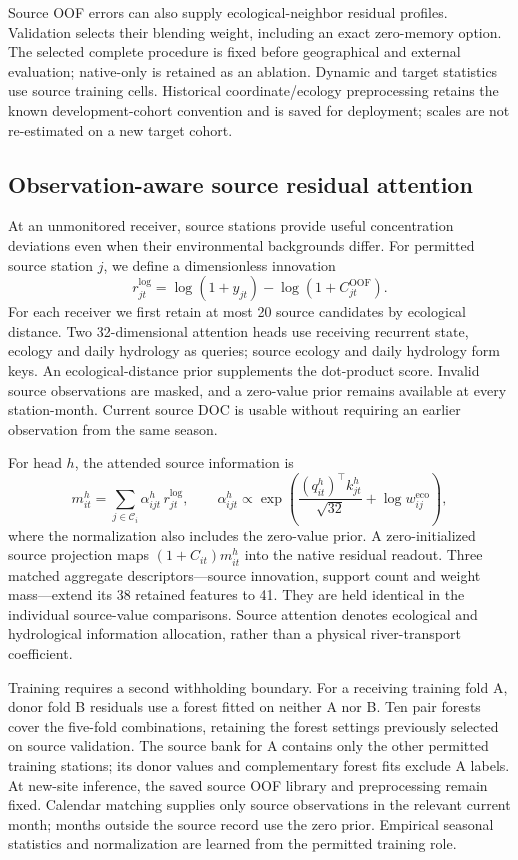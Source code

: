 \documentclass[11pt]{article}
\begin{document}
Source OOF errors can also supply ecological-neighbor residual profiles. Validation selects their blending weight, including an exact zero-memory option. The selected complete procedure is fixed before geographical and external evaluation; native-only is retained as an ablation. Dynamic and target statistics use source training cells. Historical coordinate/ecology preprocessing retains the known development-cohort convention and is saved for deployment; scales are not re-estimated on a new target cohort.

\subsection{Observation-aware source residual attention}
At an unmonitored receiver, source stations provide useful concentration deviations even when their environmental backgrounds differ. For permitted source station $j$, we define a dimensionless innovation
\[
 r^{\log}_{jt}=\log(1+y_{jt})-\log(1+C^{\mathrm{OOF}}_{jt}).
\]
For each receiver we first retain at most 20 source candidates by ecological distance. Two 32-dimensional attention heads use receiving recurrent state, ecology and daily hydrology as queries; source ecology and daily hydrology form keys. An ecological-distance prior supplements the dot-product score. Invalid source observations are masked, and a zero-value prior remains available at every station-month. Current source DOC is usable without requiring an earlier observation from the same season.

For head $h$, the attended source information is
\[
 m^h_{it}=\sum_{j\in\mathcal C_i}\alpha^h_{ijt}\,r^{\log}_{jt},\qquad
 \alpha^h_{ijt}\propto\exp\!\left(\frac{(q^h_{it})^\top k^h_{jt}}{\sqrt{32}}+\log w^{\mathrm{eco}}_{ij}\right),
\]
where the normalization also includes the zero-value prior. A zero-initialized source projection maps $(1+C_{it})m^h_{it}$ into the native residual readout. Three matched aggregate descriptors---source innovation, support count and weight mass---extend its 38 retained features to 41. They are held identical in the individual source-value comparisons. Source attention denotes ecological and hydrological information allocation, rather than a physical river-transport coefficient.

Training requires a second withholding boundary. For a receiving training fold A, donor fold B residuals use a forest fitted on neither A nor B. Ten pair forests cover the five-fold combinations, retaining the forest settings previously selected on source validation. The source bank for A contains only the other permitted training stations; its donor values and complementary forest fits exclude A labels. At new-site inference, the saved source OOF library and preprocessing remain fixed. Calendar matching supplies only source observations in the relevant current month; months outside the source record use the zero prior. Empirical seasonal statistics and normalization are learned from the permitted training role.
\end{document}
